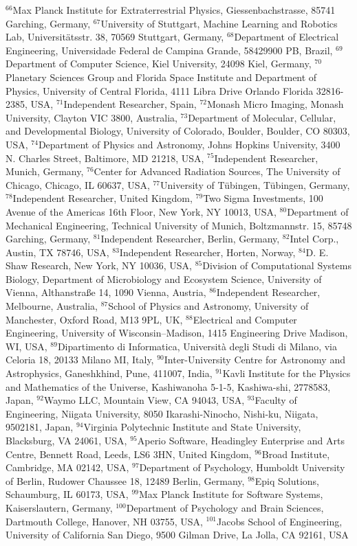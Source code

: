 $^{66}$Max Planck Institute for Extraterrestrial Physics, Giessenbachstrasse, 85741 Garching, Germany, 
$^{67}$University of Stuttgart, Machine Learning and Robotics Lab, Universitätsstr. 38, 70569 Stuttgart, Germany, 
$^{68}$Department of Electrical Engineering, Universidade Federal de Campina Grande, 58429900 PB, Brazil, 
$^{69}$Department of Computer Science, Kiel University, 24098 Kiel, Germany, 
$^{70}$Planetary Sciences Group and Florida Space Institute and Department of Physics, University of Central Florida, 4111 Libra Drive Orlando Florida 32816-2385, USA, 
$^{71}$Independent Researcher, Spain, 
$^{72}$Monash Micro Imaging, Monash University, Clayton VIC 3800, Australia, 
$^{73}$Department of Molecular, Cellular, and Developmental Biology, University of Colorado, Boulder, Boulder, CO 80303, USA, 
$^{74}$Department of Physics and Astronomy, Johns Hopkins University, 3400 N. Charles Street, Baltimore, MD 21218, USA, 
$^{75}$Independent Researcher, Munich, Germany, 
$^{76}$Center for Advanced Radiation Sources, The University of Chicago, Chicago, IL 60637, USA, 
$^{77}$University of T\"ubingen, T\"ubingen, Germany, 
$^{78}$Independent Researcher, United Kingdom, 
$^{79}$Two Sigma Investments, 100 Avenue of the Americas 16th Floor, New York, NY 10013, USA, 
$^{80}$Department of Mechanical Engineering, Technical University of Munich, Boltzmannstr. 15, 85748 Garching, Germany, 
$^{81}$Independent Researcher, Berlin, Germany, 
$^{82}$Intel Corp., Austin, TX 78746, USA, 
$^{83}$Independent Researcher, Horten, Norway, 
$^{84}$D. E. Shaw Research, New York, NY 10036, USA, 
$^{85}$Division of Computational Systems Biology, Department of Microbiology and Ecosystem Science, University of Vienna, Althanstra{\ss}e 14, 1090 Vienna, Austria, 
$^{86}$Independent Researcher, Melbourne, Australia, 
$^{87}$School of Physics and Astronomy, University of Manchester, Oxford Road, M13 9PL, UK, 
$^{88}$Electrical and Computer Engineering, University of Wisconsin--Madison, 1415 Engineering Drive Madison, WI, USA, 
$^{89}$Dipartimento di Informatica, Universit\`a degli Studi di Milano, via Celoria 18, 20133 Milano MI, Italy, 
$^{90}$Inter-University Centre for Astronomy and Astrophysics, Ganeshkhind, Pune, 411007, India, 
$^{91}$Kavli Institute for the Physics and Mathematics of the Universe, Kashiwanoha 5-1-5, Kashiwa-shi, 2778583, Japan, 
$^{92}$Waymo LLC, Mountain View, CA 94043, USA, 
$^{93}$Faculty of Engineering, Niigata University, 8050 Ikarashi-Ninocho, Nishi-ku, Niigata, 9502181, Japan, 
$^{94}$Virginia Polytechnic Institute and State University, Blacksburg, VA 24061, USA, 
$^{95}$Aperio Software, Headingley Enterprise and Arts Centre, Bennett Road, Leeds, LS6 3HN, United Kingdom, 
$^{96}$Broad Institute, Cambridge, MA 02142, USA, 
$^{97}$Department of Psychology, Humboldt University of Berlin, Rudower Chaussee 18, 12489 Berlin, Germany, 
$^{98}$Epiq Solutions, Schaumburg, IL 60173, USA, 
$^{99}$Max Planck Institute for Software Systems, Kaiserslautern, Germany, 
$^{100}$Department of Psychology and Brain Sciences, Dartmouth College, Hanover, NH 03755, USA, 
$^{101}$Jacobs School of Engineering, University of California San Diego, 9500 Gilman Drive, La Jolla, CA 92161, USA